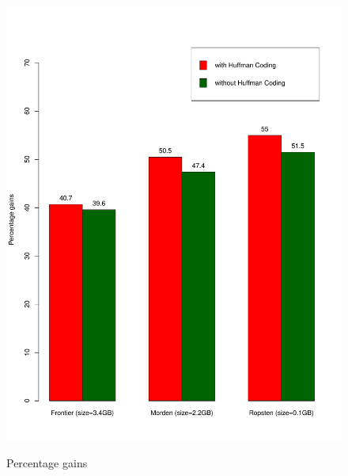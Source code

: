 \begin{figure}[!t]
\begin{floatrow}
{	\includegraphics[scale=0.45]{plots/customgains}
}{ \caption{Percentage gains}
\label{fig:origvscustom}
}
\end{floatrow}
\end{figure}

